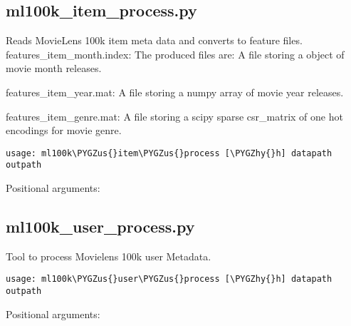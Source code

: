 \documentclass[letterpaper,10pt,english]{sphinxmanual}
\def\PYGZus{\char`\_}
\def\PYGZhy{\char`\-}
\begin{document}
\subsection{ml100k\_item\_process.py}
\label{command_line:ml100k-item-process-py}

Reads MovieLens 100k item meta data and converts to feature files. 
features\_item\_month.index: The produced files are: 
A file storing a {\hyperref[loader:loader.HotIndex]{\emph{}}} object of movie month releases.

	features\_item\_year.mat: A file storing a numpy array of movie year releases.

	features\_item\_genre.mat: A file storing a scipy sparse csr\_matrix of one hot encodings for movie genre.


\begin{Verbatim}[commandchars=\\\{\}]
usage: ml100k\PYGZus{}item\PYGZus{}process [\PYGZhy{}h] datapath outpath
\end{Verbatim}
\begin{description}
\item[{Positional arguments:}] \leavevmode{}

\end{description}


\subsection{ml100k\_user\_process.py}
\label{command_line:ml100k-user-process-py}

Tool to process Movielens 100k user Metadata.


\begin{Verbatim}[commandchars=\\\{\}]
usage: ml100k\PYGZus{}user\PYGZus{}process [\PYGZhy{}h] datapath outpath
\end{Verbatim}
\begin{description}
\item[{Positional arguments:}] \leavevmode{}

\end{description}
\end{document}
